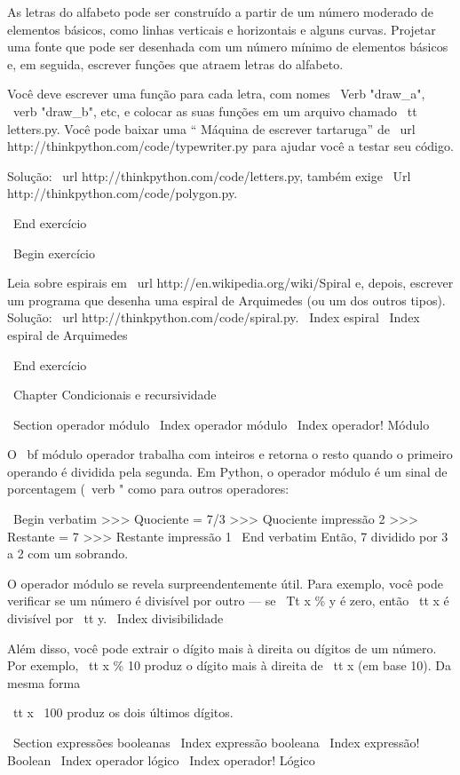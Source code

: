 \documentclass[10pt]{book}
\begin{document}
{As letras do alfabeto pode ser construído a partir de um número moderado
de elementos básicos, como linhas verticais e horizontais e alguns
curvas. Projetar uma fonte que pode ser desenhada com um número mínimo de
elementos básicos e, em seguida, escrever funções que atraem letras do
alfabeto.

Você deve escrever uma função para cada letra, com nomes
\ Verb "draw_a", \ verb "draw_b", etc, e colocar as suas funções
em um arquivo chamado {\ tt letters.py}. Você pode baixar uma
`` Máquina de escrever tartaruga'' de \ url {http://thinkpython.com/code/typewriter.py}
para ajudar você a testar seu código.

Solução: \ url {} http://thinkpython.com/code/letters.py, também exige
\ Url {http://thinkpython.com/code/polygon.py}.

\ End {} exercício

\ Begin {} exercício

Leia sobre espirais em \ url {http://en.wikipedia.org/wiki/Spiral} e, depois,
escrever um programa que desenha uma espiral de Arquimedes (ou um dos outros
tipos). Solução: \ url {http://thinkpython.com/code/spiral.py}.
\ Index {espiral}
\ Index {espiral de Arquimedes} 

\ End {} exercício


\ Chapter {Condicionais e recursividade}

\ Section {operador módulo}
\ Index {operador módulo}
\ Index {operador! Módulo}

O {\ bf módulo operador} trabalha com inteiros e retorna o resto
quando o primeiro operando é dividida pela segunda. Em Python, o
operador módulo é um sinal de porcentagem (\ verb "%
como para outros operadores:

\ Begin {verbatim}
>>> Quociente = 7/3
>>> Quociente impressão
2
>>> Restante = 7%
>>> Restante impressão
1
\ End {verbatim}
%
Então, 7 dividido por 3 a 2 com um sobrando.

O operador módulo se revela surpreendentemente útil. Para
exemplo, você pode verificar se um número é divisível por outro --- se
{\ Tt x \% y} é zero, então {\ tt x} é divisível por {\ tt y}.
\ Index {divisibilidade}

Além disso, você pode extrair o dígito mais à direita
ou dígitos de um número. Por exemplo, {\ tt x \% 10} produz o
dígito mais à direita de {\ tt x} (em base 10). Da mesma forma {\ tt x \ 100%
produz os dois últimos dígitos.


\ Section {} expressões booleanas
\ Index {expressão booleana}
\ Index {expressão! Boolean}
\ Index {operador lógico}
\ Index {operador! Lógico}

}}
\end{document}
